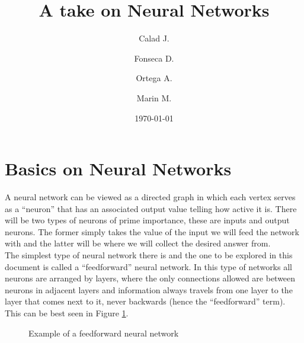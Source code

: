 \documentclass[a4paper, 12pt]{amsart}
\title{A take on Neural Networks}
\author{Calad J.}
\author{Fonseca D.}
\author{Ortega A.}
\author{Marin M.}
\date{\today}
\begin{document}
\maketitle
\tableofcontents
\section{Basics on Neural Networks}
A neural network can be viewed as a directed graph in which each vertex serves
as a ``neuron'' that has an associated output value telling how active it is.
There will be two types of neurons of prime importance, these are inputs and
output neurons. The former simply takes the value of the input we will feed the
network with and the latter will be where we will collect the desired answer
from.\\
The simplest type of neural network there is and the one to be explored
in this document is called  a ``feedforward'' neural network. In this type of
networks all neurons are arranged by layers, where the only connections allowed
are between neurons in adjacent layers and information always travels from one
layer to the layer that comes next to it, never backwards (hence the
``feedforward'' term). This can be best seen in Figure
\ref{fig:feedforward example}.

\begin{figure}[!ht]
  \centering
  \def\layersep{2.5cm}

  \caption{Example of a feedforward neural network}
  \label{fig:feedforward example}
\end{figure}
\end{document}

